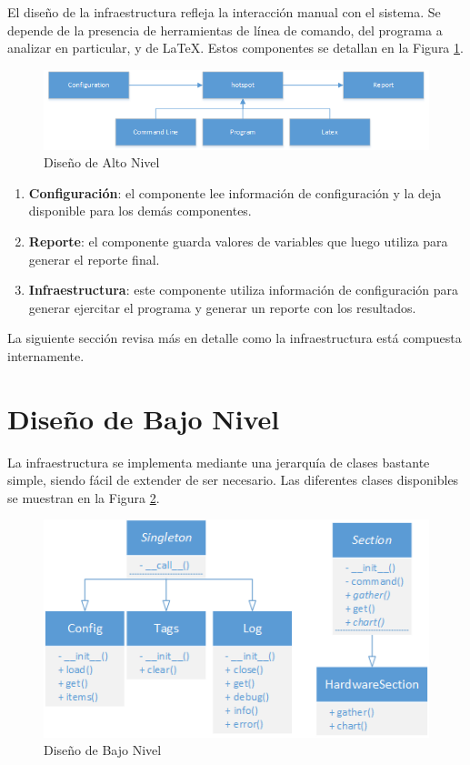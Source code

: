 \documentclass[a4paper]{report}
\begin{document}
El diseño de la infraestructura refleja la interacción manual con el sistema. 
Se depende de la presencia de herramientas de línea de comando, del programa a analizar en particular, y de \LaTeX.
Estos componentes se detallan en la Figura \ref{fig:hotspot-hld}.

\begin{figure}[H]
\begin{center}
\includegraphics[width=\textwidth]{hotspot-hld.png}
\caption{Diseño de Alto Nivel}
\label{fig:hotspot-hld}
\end{center}
\end{figure}

\begin{enumerate}
\item{\bf Configuración}: el componente lee información de configuración y la deja disponible para los demás componentes.
\item{\bf Reporte}: el componente guarda valores de variables que luego utiliza para generar el reporte final. 
\item{\bf Infraestructura}: este componente utiliza información de configuración para generar ejercitar el programa y generar un reporte con los resultados.
\end{enumerate}

La siguiente sección revisa más en detalle como la infraestructura está compuesta internamente.

\section{Diseño de Bajo Nivel}

La infraestructura se implementa mediante una jerarquía de clases bastante simple, siendo fácil de extender de ser necesario.
Las diferentes clases disponibles se muestran en la Figura \ref{fig:hotspot-lld}.

\begin{figure}[H]
\begin{center}
\includegraphics[width=\textwidth]{hotspot-lld.png}
\caption{Diseño de Bajo Nivel}
\label{fig:hotspot-lld}
\end{center}
\end{figure}
\end{document}
